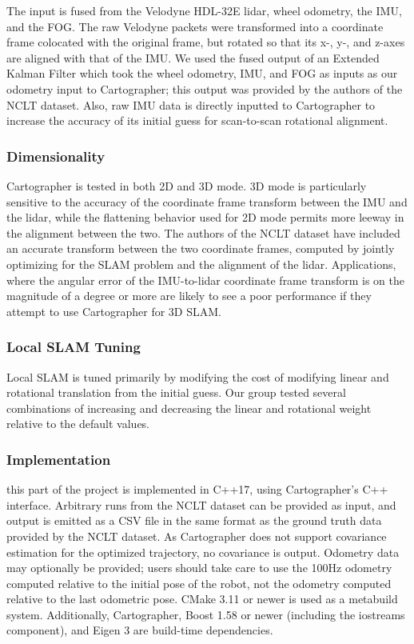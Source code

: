 The input is fused from the Velodyne HDL-32E lidar, wheel odometry, the IMU, and the FOG. The raw Velodyne packets were transformed into a coordinate frame colocated with the original frame, but rotated so that its x-, y-, and z-axes are aligned with that of the IMU. We used the fused output of an Extended Kalman Filter which took the wheel odometry, IMU, and FOG as inputs as our odometry input to Cartographer; this output was provided by the authors of the NCLT dataset. Also, raw IMU data is directly inputted to Cartographer to increase the accuracy of its initial guess for scan-to-scan rotational alignment.


\subsubsection{Dimensionality}

Cartographer is tested in both 2D and 3D mode. 3D mode is particularly sensitive to the accuracy of the coordinate frame transform between the IMU and the lidar, while the flattening behavior used for 2D mode permits more leeway in the alignment between the two. The authors of the NCLT dataset have included an accurate transform between the two coordinate frames, computed by jointly optimizing for the SLAM problem and the alignment of the lidar. Applications, where the angular error of the IMU-to-lidar coordinate frame transform is on the magnitude of a degree or more are likely to see a poor performance if they attempt to use Cartographer for 3D SLAM.

\subsubsection{Local SLAM Tuning}

Local SLAM is tuned primarily by modifying the cost of modifying linear and rotational translation from the initial guess. Our group tested several combinations of increasing and decreasing the linear and rotational weight relative to the default values.

\subsubsection{Implementation}

this part of the project is implemented in C++17, using Cartographer's C++ interface. Arbitrary runs from the NCLT dataset can be provided as input, and output is emitted as a CSV file in the same format as the ground truth data provided by the NCLT dataset. As Cartographer does not support covariance estimation for the optimized trajectory, no covariance is output. Odometry data may optionally be provided; users should take care to use the 100Hz odometry computed relative to the initial pose of the robot, not the odometry computed relative to the last odometric pose. CMake 3.11 or newer is used as a metabuild system. Additionally, Cartographer, Boost 1.58 or newer (including the iostreams component), and Eigen 3 are build-time dependencies.

